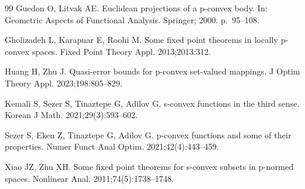 \documentclass[10pt]{article}
\begin{document}
\begin{thebibliography}{99}
Guedon O, Litvak AE.
Euclidean projections of a p-convex body.
In: Geometric Aspects of Functional Analysis.
Springer; 2000. p.~95--108.

Gholizadeh L, Karapnar E, Roohi M.
Some fixed point theorems in locally p-convex spaces.
Fixed Point Theory Appl. 2013;2013:312.

Huang H, Zhu J.
Quasi-error bounds for p-convex set-valued mappings.
J Optim Theory Appl. 2023;198:805--829.

Kemali S, Sezer S, Tinaztepe G, Adilov G.
s-convex functions in the third sense.
Korean J Math. 2021;29(3):593--602.

Sezer S, Eken Z, Tinaztepe G, Adilov G.
p-convex functions and some of their properties.
Numer Funct Anal Optim. 2021;42(4):443--459.

Xiao JZ, Zhu XH.
Some fixed point theorems for s-convex subsets in p-normed spaces.
Nonlinear Anal. 2011;74(5):1738--1748.

\end{thebibliography}
\end{document}
